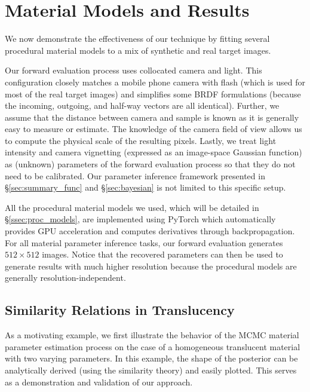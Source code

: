 \section{Material Models and Results}
\label{sec:results}
%


We now demonstrate the effectiveness of our technique by fitting several procedural material models to a mix of synthetic and real target images.

Our forward evaluation process uses collocated camera and light.
This configuration closely matches a mobile phone camera with flash (which is used for most of the real target images) and simplifies some BRDF formulations (because the incoming, outgoing, and half-way vectors are all identical).
Further, we assume that the distance between camera and sample is known as it is generally easy to measure or estimate.
The knowledge of the camera field of view allows us to compute the physical scale of the resulting pixels.
Lastly, we treat light intensity and camera vignetting (expressed as an image-space Gaussian function) as (unknown) parameters of the forward evaluation process so that they do not need to be calibrated.
Our parameter inference framework presented in \S\ref{sec:summary_func} and \S\ref{sec:bayesian} is not limited to this specific setup.

All the procedural material models we used, which will be detailed in \S\ref{ssec:proc_models}, are implemented using \textsf{PyTorch} which automatically provides GPU acceleration and computes derivatives through backpropagation. 
For all material parameter inference tasks, our forward evaluation generates $512 \times 512$ images.
Notice that the recovered parameters can then be used to generate results with much higher resolution because the procedural models are generally resolution-independent.

\subsection{Similarity Relations in Translucency}

As a motivating example, we first illustrate the behavior of the MCMC material parameter estimation process on the case of a homogeneous translucent material with two varying parameters.
In this example, the shape of the posterior can be analytically derived (using the similarity theory) and easily plotted. This serves as a demonstration and validation of our approach.

